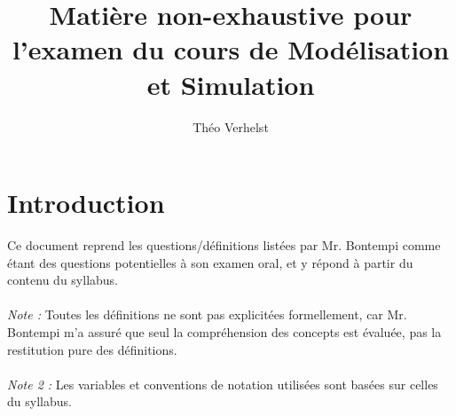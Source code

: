 \documentclass[a4paper]{article}
\author{Théo Verhelst}
\title{Matière non-exhaustive pour l'examen du cours de Modélisation et Simulation}
\begin{document}
\maketitle
\section{Introduction}
Ce document reprend les questions/définitions listées par Mr. Bontempi comme étant des questions potentielles à son examen
oral, et y répond à partir du contenu du syllabus.
\paragraph{}
\emph{Note :} Toutes les définitions ne sont pas explicitées formellement, car Mr. Bontempi m'a assuré que seul
la compréhension des concepts est évaluée, pas la restitution pure des définitions.
\paragraph{}
\emph{Note 2 :} Les variables et conventions de notation utilisées sont basées sur celles du syllabus.
\end{document}
